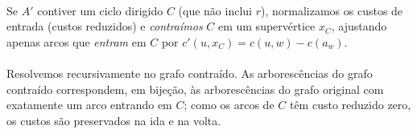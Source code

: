 \documentclass[12pt,a4paper]{article}
\begin{document}
\paragraph{}
Se \(A'\) contiver um ciclo dirigido \(C\) (que não inclui \(r\)), normalizamos os custos de entrada (custos reduzidos) e \emph{contraímos} \(C\) em um supervértice \(x_C\), ajustando apenas arcos que \emph{entram} em \(C\) por \(c'(u,x_C)=c(u,w)-c(a_w)\). 

\paragraph{}
Resolvemos recursivamente no grafo contraído. As arborescências do grafo contraído correspondem, em bijeção, às arborescências do grafo original com exatamente um arco entrando em \(C\); como os arcos de \(C\) têm custo reduzido zero, os custos são preservados na ida e na volta. 
\end{document}
